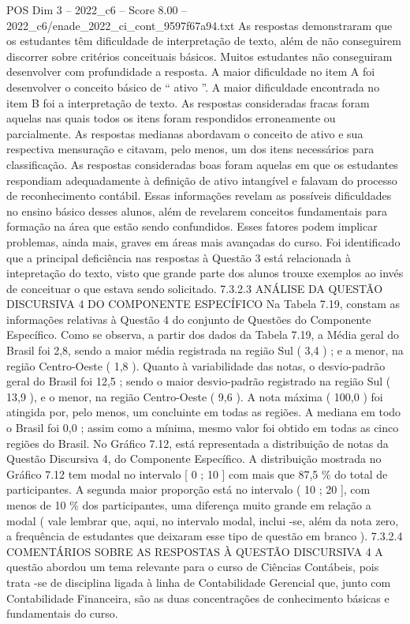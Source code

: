 \begin{textsample}{POS Dim 3 – 2022\_c6 – Score 8.00 – 2022\_c6/enade\_2022\_ci\_cont\_9597f67a94.txt}
As respostas demonstraram que os estudantes têm dificuldade de interpretação de texto, além de não conseguirem discorrer sobre critérios conceituais básicos.
Muitos estudantes não conseguiram desenvolver com profundidade a resposta.
A maior dificuldade no item A foi desenvolver o conceito básico de “ ativo ”.
A maior dificuldade encontrada no item B foi a interpretação de texto.
As respostas consideradas fracas foram aquelas nas quais todos os itens foram respondidos erroneamente ou parcialmente.
As respostas medianas abordavam o conceito de ativo e sua respectiva mensuração e citavam, pelo menos, um dos itens necessários para classificação.
As respostas consideradas boas foram aquelas em que os estudantes respondiam adequadamente à definição de ativo intangível e falavam do processo de reconhecimento contábil.
Essas informações revelam as possíveis dificuldades no ensino básico desses alunos, além de revelarem conceitos fundamentais para formação na área que estão sendo confundidos.
Esses fatores podem implicar problemas, ainda mais, graves em áreas mais avançadas do curso.
Foi identificado que a principal deficiência nas respostas à Questão 3 está relacionada à intepretação do texto, visto que grande parte dos alunos trouxe exemplos ao invés de conceituar o que estava sendo solicitado. 7.3.2.3 ANÁLISE DA QUESTÃO DISCURSIVA 4 DO COMPONENTE ESPECÍFICO Na Tabela 7.19, constam as informações relativas à Questão 4 do conjunto de Questões do Componente Específico.
Como se observa, a partir dos dados da Tabela 7.19, a Média geral do Brasil foi 2,8, sendo a maior média registrada na região Sul ( 3,4 ) ; e a menor, na região Centro-Oeste ( 1,8 ).
Quanto à variabilidade das notas, o desvio-padrão geral do Brasil foi 12,5 ; sendo o maior desvio-padrão registrado na região Sul ( 13,9 ), e o menor, na região Centro-Oeste ( 9,6 ).
A nota máxima ( 100,0 ) foi atingida por, pelo menos, um concluinte em todas as regiões.
A mediana em todo o Brasil foi 0,0 ; assim como a mínima, mesmo valor foi obtido em todas as cinco regiões do Brasil.
No Gráfico 7.12, está representada a distribuição de notas da Questão Discursiva 4, do Componente Específico.
A distribuição mostrada no Gráfico 7.12 tem modal no intervalo [ 0 ; 10 ] com mais que 87,5 \% do total de participantes.
A segunda maior proporção está no intervalo ( 10 ; 20 ], com menos de 10 \% dos participantes, uma diferença muito grande em relação a modal ( vale lembrar que, aqui, no intervalo modal, inclui -se, além da nota zero, a frequência de estudantes que deixaram esse tipo de questão em branco ). 7.3.2.4 COMENTÁRIOS SOBRE AS RESPOSTAS À QUESTÃO DISCURSIVA 4 A questão abordou um tema relevante para o curso de Ciências Contábeis, pois trata -se de disciplina ligada à linha de Contabilidade Gerencial que, junto com Contabilidade Financeira, são as duas concentrações de conhecimento básicas e fundamentais do curso.

\end{textsample}
